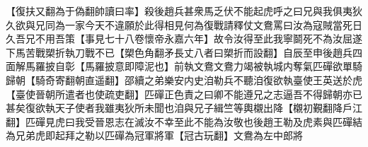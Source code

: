 【復扶又翻為于偽翻帥讀曰率】殺後趙兵甚衆馬乏伏不能起虎呼之曰兄與我俱夷狄久欲與兄同為一家今天不違願於此得相見何為復戰請釋仗文鴦罵曰汝為寇賊當死日久吾兄不用吾策【事見七十八卷懷帝永嘉六年】故令汝得至此我寧鬬死不為汝屈遂下馬苦戰槊折執刀戰不已【槊色角翻矛長丈八者曰槊折而設翻】自辰至申後趙兵四面解馬羅披自彰【馬羅披意即障泥也】前執文鴦文鴦力竭被執城内奪氣匹磾欲單騎歸朝【騎奇寄翻朝直遥翻】邵續之弟樂安内史洎勒兵不聽洎復欲執臺使王英送於虎【臺使晉朝所遣者也使疏吏翻】匹磾正色責之曰卿不能遵兄之志逼吾不得歸朝亦已甚矣復欲執天子使者我雖夷狄所未聞也洎與兄子緝竺等輿櫬出降【櫬初覲翻降戶江翻】匹磾見虎曰我受晉恩志在滅汝不幸至此不能為汝敬也後趙王勒及虎素與匹磾結為兄弟虎即起拜之勒以匹磾為冠軍將軍【冠古玩翻】文鴦為左中郎將